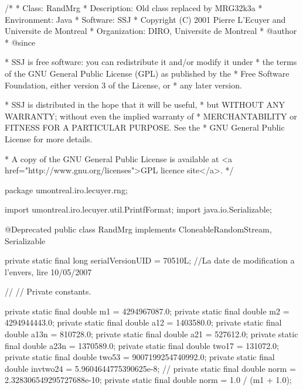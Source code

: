 \begin{code}
\begin{hide}
/*
 * Class:        RandMrg
 * Description:  Old class replaced by MRG32k3a
 * Environment:  Java
 * Software:     SSJ 
 * Copyright (C) 2001  Pierre L'Ecuyer and Universite de Montreal
 * Organization: DIRO, Universite de Montreal
 * @author       
 * @since

 * SSJ is free software: you can redistribute it and/or modify it under
 * the terms of the GNU General Public License (GPL) as published by the
 * Free Software Foundation, either version 3 of the License, or
 * any later version.

 * SSJ is distributed in the hope that it will be useful,
 * but WITHOUT ANY WARRANTY; without even the implied warranty of
 * MERCHANTABILITY or FITNESS FOR A PARTICULAR PURPOSE.  See the
 * GNU General Public License for more details.

 * A copy of the GNU General Public License is available at
   <a href="http://www.gnu.org/licenses">GPL licence site</a>.
 */
\end{hide}
package umontreal.iro.lecuyer.rng; \begin{hide}

import umontreal.iro.lecuyer.util.PrintfFormat;
import java.io.Serializable;
\end{hide}

@Deprecated
public class RandMrg implements CloneableRandomStream, Serializable\begin{hide} {

   private static final long serialVersionUID = 70510L;
   //La date de modification a l'envers, lire 10/05/2007

// %
// Private constants.

   private static final double m1     = 4294967087.0;
   private static final double m2     = 4294944443.0;
   private static final double a12    =  1403580.0;
   private static final double a13n   =   810728.0;
   private static final double a21    =   527612.0;
   private static final double a23n   =   1370589.0;
   private static final double two17    =  131072.0;
   private static final double two53    =  9007199254740992.0;
   private static final double invtwo24 = 5.9604644775390625e-8;
//   private static final double norm   = 2.328306549295727688e-10;
   private static final double norm   = 1.0 / (m1 + 1.0);

}
\end{hide}
\end{code}
